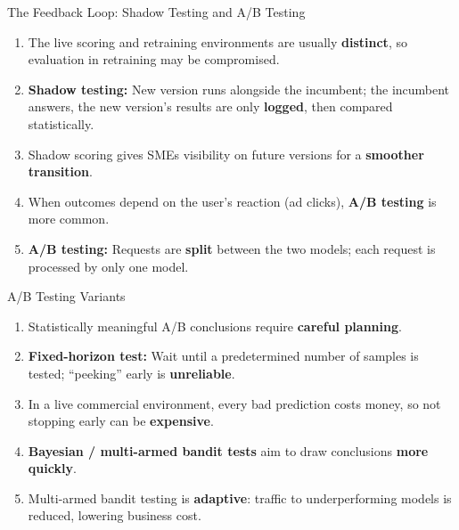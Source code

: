 \begin{frame}{The Feedback Loop: Shadow Testing and A/B Testing}
\begin{enumerate}
\item<1-> The live scoring and retraining environments are usually \textbf{distinct}, so evaluation in retraining may be compromised.
\item<2-> \textbf{Shadow testing:} New version runs alongside the incumbent; the incumbent answers, the new version's results are only \textbf{logged}, then compared statistically.
\item<3-> Shadow scoring gives SMEs visibility on future versions for a \textbf{smoother transition}.
\item<4-> When outcomes depend on the user's reaction (ad clicks), \textbf{A/B testing} is more common.
\item<5-> \textbf{A/B testing:} Requests are \textbf{split} between the two models; each request is processed by only one model.
\end{enumerate}
\end{frame}

\begin{frame}{A/B Testing Variants}
\begin{enumerate}
\item<1-> Statistically meaningful A/B conclusions require \textbf{careful planning}.
\item<2-> \textbf{Fixed-horizon test:} Wait until a predetermined number of samples is tested; ``peeking'' early is \textbf{unreliable}.
\item<3-> In a live commercial environment, every bad prediction costs money, so not stopping early can be \textbf{expensive}.
\item<4-> \textbf{Bayesian / multi-armed bandit tests} aim to draw conclusions \textbf{more quickly}.
\item<5-> Multi-armed bandit testing is \textbf{adaptive}: traffic to underperforming models is reduced, lowering business cost.
\end{enumerate}
\end{frame}

